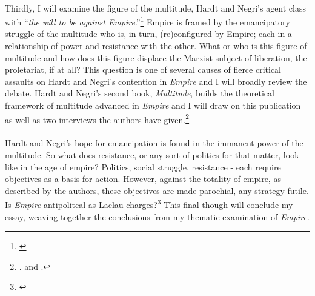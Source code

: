 \paragraph{}Thirdly, I will examine the figure of the multitude, Hardt and Negri's agent class with ``\textit{the will to be against Empire}.''\footnote{\cite[p. 210, emphasis in original]{Hardt:2001jl}} Empire is framed by the emancipatory struggle of the multitude who is, in turn, (re)configured by Empire; each in a relationship of power and resistance with the other. What or who is this figure of multitude and how does this figure displace the Marxist subject of liberation, the proletariat, if at all? This question is one of several causes of fierce critical assaults on Hardt and Negri's contention in \textit{Empire} and I will broadly review the debate. Hardt and Negri's second book, \textit{Multitude}, builds the theoretical framework of multitude advanced in \textit{Empire} and I will draw on this publication as well as two interviews the authors have given.\footnote{\cite{Hardt:2005zt}. \cite{brown:2005cs} and \cite{dumm:2005te}.}

\paragraph{}Hardt and Negri's hope for emancipation is found in the immanent power of the multitude. So what does resistance, or any sort of politics for that matter, look like in the age of empire? Politics, social struggle, resistance - each require objectives as a basis for action. However, against the totality of empire, as described by the authors, these objectives are made parochial, any strategy futile. Is \textit{Empire} antipolitcal as Laclau charges?\footnote{\cite{laclau:2005ss}} This final though will conclude my essay, weaving together the conclusions from my thematic examination of \textit{Empire}.